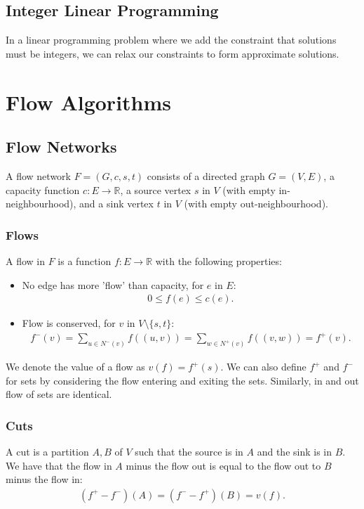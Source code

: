 \documentclass[a4paper, 12pt, twoside]{article}
\begin{document}
\subsection{Integer Linear Programming}

In a linear programming problem where we add the constraint that solutions must be
integers, we can relax our constraints to form approximate solutions.

\section{Flow Algorithms}

\subsection{Flow Networks}

A flow network $F = (G, c, s, t)$ consists of a directed graph $G = (V, E)$, a capacity function
$c : E \to \mathbb{R}$, a source vertex $s$ in $V$ (with empty in-neighbourhood), and a sink
vertex $t$ in $V$ (with empty out-neighbourhood).

\subsubsection{Flows}

A flow in $F$ is a function $f : E \to \mathbb{R}$ with the following properties: \begin{itemize}
  \item No edge has more 'flow' than capacity, for $e$ in $E$: \begin{gather*}
    0 \leq f(e) \leq c(e).
  \end{gather*}
  \item Flow is conserved, for $v$ in $V \setminus \{s, t\}$: \begin{gather*}
    f^-(v) = \sum_{u \in N^-(v)} f((u, v)) = \sum_{w \in N^+(v)} f((v, w)) = f^+(v).
  \end{gather*}
\end{itemize} We denote the value of a flow as $v(f) = f^+(s)$. We can also define $f^+$ and $f^-$
for sets by considering the flow entering and exiting the sets. Similarly, in and out flow
of sets are identical.

\subsubsection{Cuts}

A cut is a partition $A, B$ of $V$ such that the source is in $A$ and the sink is in $B$.
We have that the flow in $A$ minus the flow out is equal to the flow out to $B$ minus the flow in:
\begin{gather*}
  (f^+ - f^-)(A) = (f^- - f^+)(B) = v(f).
\end{gather*}
\end{document}
